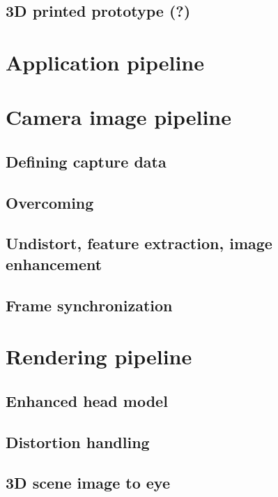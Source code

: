 \subsection{3D printed prototype (?)}


\section{Application pipeline}


\section{Camera image pipeline}

\subsection{Defining capture data}

\subsection{Overcoming }

\subsection{Undistort, feature extraction, image enhancement}

\subsection{Frame synchronization}

\section{Rendering pipeline}

\subsection{Enhanced head model}

\subsection{Distortion handling}

\subsection{3D scene image to eye}

